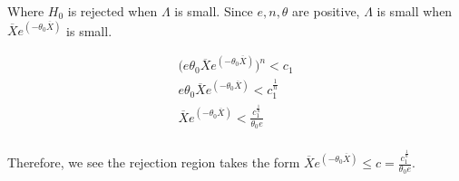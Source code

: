 \documentclass{tufte-book}
\theoremstyle{mytheoremstyle}
\theoremstyle{mylemstyle}
\theoremstyle{mydefstyle}
\begin{document}
Where $H_0$ is rejected when $\Lambda$ is small.  Since $e, n, \theta$ are positive, $\Lambda$ is small when $\overline{X} e^{(-\theta_0 \overline{X})}$ is small.

\begin{align*}
\big(e \theta_0 \overline{X} e^{(-\theta_0 \overline{X})}\big)^n < c_1\\
e \theta_0 \overline{X} e^{(-\theta_0 \overline{X})} < c_1^{\frac{1}{n}}\\
\overline{X} e^{(-\theta_0 \overline{X})} < \frac{c_1^{\frac{1}{n}}}{\theta_0 e}\\
\end{align*}

Therefore, we see the rejection region takes the form $\overline{X} e^{(-\theta_0 \overline{X})} \leq c =\frac{c_1^{\frac{1}{n}}}{\theta_0 e}$.
\end{document}
